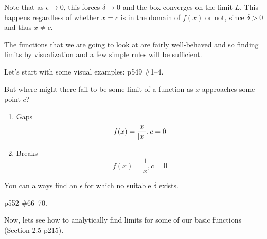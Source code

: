 \documentclass[letterpaper,12pt,fleqn]{article}
\newcommand{\e}{\epsilon}
\renewcommand{\d}{\delta}
\begin{document}
Note that as \(\e\to0\), this forces \(\d\to0\) and the box converges on the limit \(L\).  This happens regardless of whether
\(x=c\) is in the domain of \(f(x)\) or not, since \(\d>0\) and thus \(x\ne c\).

The functions that we are going to look at are fairly well-behaved and so finding limits by visualization and a few
simple rules will be sufficient.

\begin{examples}
  Let's start with some visual examples: p549 \#1--4.
\end{examples}

But where might there fail to be some limit of a function as \(x\) approaches some point \(c\)?
\begin{enumerate}
\item Gaps
  \[f(x)=\frac{x}{\lvert x\rvert}, c=0\]

\item Breaks
  \[f(x)=\frac{1}{x}, c=0\]
\end{enumerate}
You can always find an \(\e\) for which no suitable \(\d\) exists.

\begin{examples}
  p552 \#66--70.
\end{examples}

Now, lets see how to analytically find limits for some of our basic functions (Section 2.5 p215).
\end{document}
